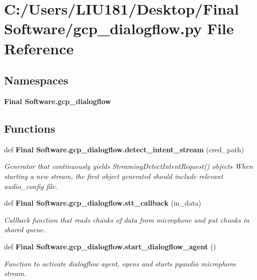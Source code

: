 \section{C\+:/\+Users/\+L\+I\+U181/\+Desktop/\+Final Software/gcp\+\_\+dialogflow.py File Reference}
\label{gcp__dialogflow_8py}
\subsection*{Namespaces}
\begin{DoxyCompactItemize}
\item 
 \textbf{ Final Software.\+gcp\+\_\+dialogflow}
\end{DoxyCompactItemize}
\subsection*{Functions}
\begin{DoxyCompactItemize}
\item 
def \textbf{ Final Software.\+gcp\+\_\+dialogflow.\+detect\+\_\+intent\+\_\+stream} (cred\+\_\+path)
\begin{DoxyCompactList}\small\item\em Generator that continuously yields Streaming\+Detect\+Intent\+Request() objects When starting a new stream, the first object generated should include relevant audio\+\_\+config file. \end{DoxyCompactList}\item 
def \textbf{ Final Software.\+gcp\+\_\+dialogflow.\+stt\+\_\+callback} (in\+\_\+data)
\begin{DoxyCompactList}\small\item\em Callback function that reads chunks of data from microphone and put chunks in shared queue. \end{DoxyCompactList}\item 
def \textbf{ Final Software.\+gcp\+\_\+dialogflow.\+start\+\_\+dialogflow\+\_\+agent} ()
\begin{DoxyCompactList}\small\item\em Function to activate dialogflow agent, opens and starts pyaudio microphone stream. \end{DoxyCompactList}\end{DoxyCompactItemize}
